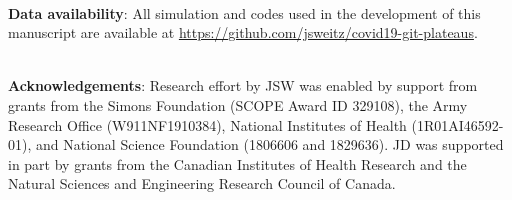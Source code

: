 \mbox{}\\
\noindent
\textbf{Data availability}:
All simulation and codes used in the development of this manuscript are available at \url{https://github.com/jsweitz/covid19-git-plateaus}.

\mbox{}\\
\noindent
\textbf{Acknowledgements}:
Research effort by JSW was enabled
by support from grants from the Simons Foundation (SCOPE Award ID 329108), the Army Research 
Office (W911NF1910384), National Institutes of Health (1R01AI46592-01), 
and National Science Foundation (1806606 and 1829636). JD was supported in part by 
grants from the Canadian Institutes of Health Research and the Natural Sciences and Engineering Research Council of Canada.
